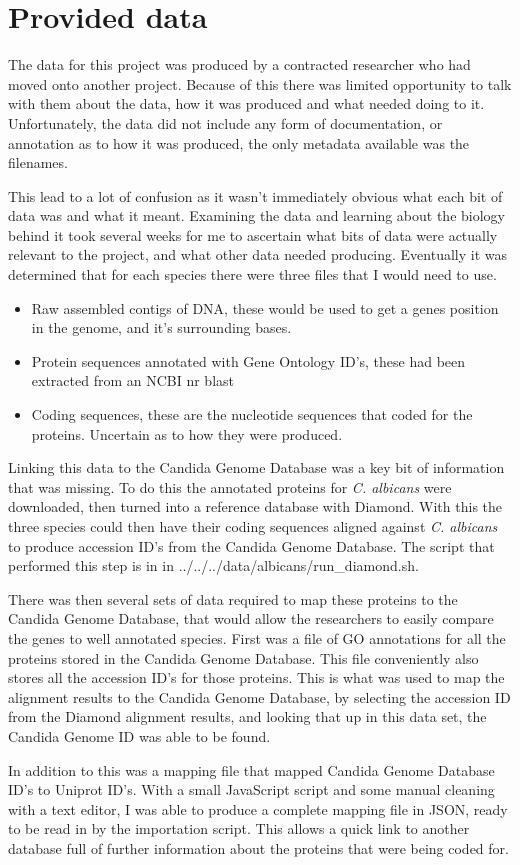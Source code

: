 \section{Provided data}
The data for this project was produced by a contracted researcher who had moved onto another project. Because of this there was limited opportunity to talk with them about the data, how it was produced and what needed doing to it. Unfortunately, the data did not include any form of documentation, or annotation as to how it was produced, the only metadata available was the filenames. 

This lead to a lot of confusion as it wasn't immediately obvious what each bit of data was and what it meant. Examining the data and learning about the biology behind it took several weeks for me to ascertain what bits of data were actually relevant to the project, and what other data needed producing. Eventually it was determined that for each species there were three files that I would need to use.

\begin{itemize}
  \item Raw assembled contigs of DNA, these would be used to get a genes position in the genome, and it's surrounding bases. 
  \item Protein sequences annotated with Gene Ontology ID's, these had been extracted from an NCBI nr blast
  \item Coding sequences, these are the nucleotide sequences that coded for the proteins. Uncertain as to how they were produced.
\end{itemize}

Linking this data to the Candida Genome Database was a key bit of information that was missing. To do this the annotated proteins for \textit{C. albicans}\cite{albicans} were downloaded, then turned into a reference database with Diamond. With this the three species could then have their coding sequences aligned against \textit{C. albicans} to produce accession ID's from the Candida Genome Database. The script that performed this step is in in ../../../data/albicans/run_diamond.sh.

There was then several sets of data required to map these proteins to the Candida Genome Database, that would allow the researchers to easily compare the genes to well annotated species. First was a file of GO annotations for all the proteins stored in the Candida Genome Database\cite{cgd-proteins}. This file conveniently also stores all the accession ID's for those proteins. This is what was used to map the alignment results to the Candida Genome Database, by selecting the accession ID from the Diamond alignment results, and looking that up in this data set, the Candida Genome ID was able to be found.

In addition to this was a mapping file that mapped Candida Genome Database ID's to Uniprot ID's. With a small JavaScript script and some manual cleaning with a text editor, I was able to produce a complete mapping file in JSON, ready to be read in by the importation script. This allows a quick link to another database full of further information about the proteins that were being coded for. 
